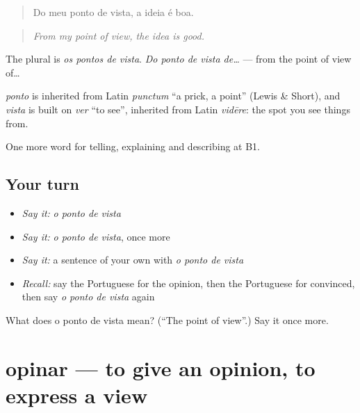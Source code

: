 \begin{quote}
Do meu ponto de vista, a ideia é boa.
\end{quote}

\begin{quote}
\emph{From my point of view, the idea is good.}
\end{quote}

The plural is \emph{os pontos de vista}. \emph{Do ponto de vista de…} — from the point of view of…

\begin{cousinweb}
\emph{ponto} is inherited from Latin \emph{punctum} \textquotedblleft{}a prick, a point\textquotedblright{} (Lewis \& Short), and \emph{vista} is built on \emph{ver} \textquotedblleft{}to see\textquotedblright{}, inherited from Latin \emph{vidēre}: the spot you see things from.
\end{cousinweb}

\begin{grammarlens}[title={What you've built}]
One more word for telling, explaining and describing at B1.
\end{grammarlens}

\subsection*{Your turn}
\begin{itemize}
\raggedright
  \item \emph{Say it:} \emph{o ponto de vista}
  \item \emph{Say it:} \emph{o ponto de vista}, once more
  \item \emph{Say it:} a sentence of your own with \emph{o ponto de vista}
  \item \emph{Recall:} say the Portuguese for the opinion, then the Portuguese for convinced, then say \emph{o ponto de vista} again
\end{itemize}

\begin{tcolorbox}[breakable,colback=teal!4,colframe=teal!35!black,title={Before you move on}]
What does o ponto de vista mean? (\textquotedblleft{}The point of view\textquotedblright{}.) Say it once more.
\end{tcolorbox}
\section[opinar]{opinar — to give an opinion, to express a view}

\label{lesson:PT-C335-opinar}



